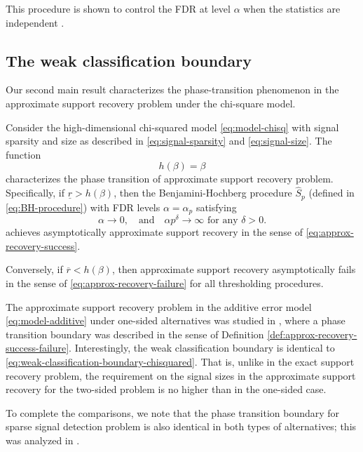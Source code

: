 This procedure is shown to control the FDR at level $\alpha$ when the statistics are
independent \cite{benjamini1995controlling}.

\subsection{The weak classification boundary}
\label{subsec:weak-classification-boundary}

Our second main result characterizes the phase-transition phenomenon in the approximate support recovery problem under the chi-square model.

\begin{theorem} \label{thm:chi-squred-weak-boundary}
Consider the high-dimensional chi-squared model \eqref{eq:model-chisq} with signal sparsity and size as described in \eqref{eq:signal-sparsity} and \eqref{eq:signal-size}.
The function 
\begin{equation} \label{eq:weak-classification-boundary-chisquared}
    h(\beta) = \beta
\end{equation}
characterizes the phase transition of approximate support recovery problem.
Specifically, if $\underline{r} > {h}(\beta)$, then the Benjamini-Hochberg procedure $\widehat{S}_p$ (defined in \eqref{eq:BH-procedure}) with FDR levels $\alpha=\alpha_p$ satisfying
\begin{equation} \label{eq:FDR-rate-to-zero}
    \alpha\to 0,\quad \text{and} \quad \alpha p^\delta\to\infty \text{  for any } \delta>0.
\end{equation}
achieves asymptotically approximate support recovery in the sense of \eqref{eq:approx-recovery-success}. 

Conversely, if $\overline{r} < {h}(\beta)$, then approximate support recovery asymptotically fails in the sense of \eqref{eq:approx-recovery-failure} for all thresholding procedures.
\end{theorem}

\begin{remark}
The approximate support recovery problem in the additive error model \eqref{eq:model-additive} under one-sided alternatives was studied in \cite{arias2017distribution}, where a phase transition boundary was described in the sense of Definition \ref{def:approx-recovery-success-failure}.
Interestingly, the weak classification boundary is identical to \eqref{eq:weak-classification-boundary-chisquared}.
That is, unlike in the exact support recovery problem, the requirement on the signal sizes in the approximate support recovery for the two-sided problem is no higher than in the one-sided case.

To complete the comparisons, we note that the phase transition boundary for sparse signal detection problem is also identical in both types of alternatives; this was analyzed in \cite{donoho2004higher}.
\end{remark}